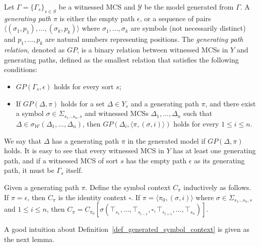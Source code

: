 \documentclass[acmsmall]{acmart}
\theoremstyle{acmdefinition}
\newcommand{\WW}{\mathcal{W}}
\newcommand{\YY}{\mathcal{Y}}
\newcommand{\GP}{GP}  %
\newcommand{\seq}[1]{\langle #1 \rangle} %
\newcommand{\hole}{\square}
\newcommand{\ddd}{,\dots,}
\newcommand{\sigmaMGammaoc}{\sigma_\WW}
\newcommand{\Cpi}{{C_\pi}}
\newcommand{\SigmaSub}[1]{\Sigma_{#1}}
\begin{document}
\begin{definition}
\label{def_generating_path}
Let $\Gamma = \{ \Gamma_s \}_{s \in S}$ be a witnessed MCS and
$\YY$ be the model generated from $\Gamma$.
A \emph{generating path} $\pi$ is either the empty path $\epsilon$, or
a sequence of pairs 
$\seq{(\sigma_1, p_1) \ddd (\sigma_k , p_k)}$
where $\sigma_1 \ddd \sigma_k$ are symbols (not necessarily distinct)
and $p_1 \ddd p_k$ are natural numbers representing positions.
The \emph{generating path relation}, denoted as $\GP$,
is a binary relation
between witnessed MCSs in $Y$
and generating paths,
defined as the smallest relation that satisfies the following conditions:
\begin{itemize}
\item $\GP(\Gamma_s, \epsilon)$ holds for every sort $s$;
\item If $\GP(\Delta,\pi)$ holds for a set $\Delta \in Y_s$ and a generating path $\pi$,
      and there exist a symbol $\sigma \in \SigmaSub{s_1 \dots s_n, s}$ and 
      witnessed MCSs $\Delta_1 \ddd \Delta_n$ such that
      $\Delta \in \sigmaMGammaoc(\Delta_1,\dots,\Delta_n)$,
      then $\GP(\Delta_i, \seq{\pi, (\sigma,i)} )$ holds
      for every $1 \le i \le n$.
\end{itemize}
We say that $\Delta$ has a generating path $\pi$ in the generated model if
$\GP(\Delta,\pi)$ holds.
It is easy to see that every witnessed MCS in $Y$
has at least one generating path,
and if a witnessed MCS of sort $s$
has the empty path $\epsilon$ as its generating path,
it must be $\Gamma_s$ itself.
\end{definition}

\begin{definition}
\label{def_generated_symbol_context}
Given a generating path $\pi$.
Define the symbol context $\Cpi$
inductively as follows.
If $\pi = \epsilon$, 
then $\Cpi$ is the identity context $\hole$.
If $\pi = \seq{\pi_0 , (\sigma, i)}$
where  $\sigma \in \SigmaSub{s_1 \dots s_n , s}$
and $1 \le i \le n$,
then
$\Cpi = C_{\pi_0}[
\sigma(\top_{s_1} \ddd \top_{s_{i-1}} , \hole , 
\top_{s_{i+1}} \ddd \top_{s_n})
]$.
\end{definition}

A good intuition about Definition~\ref{def_generated_symbol_context}
is given as the next lemma.
\end{document}
